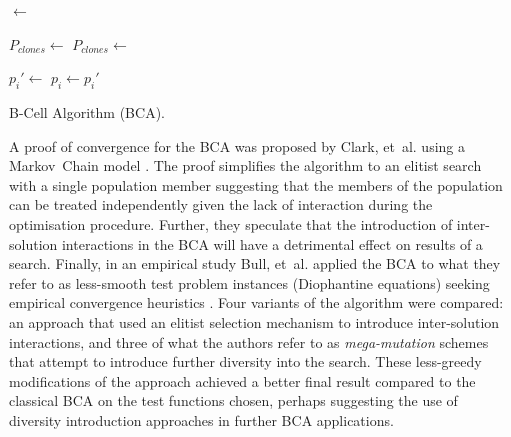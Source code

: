 \begin{algorithm}[ht]
  \SetLine
  
  
  
  \KwOut{\Pop}      
  
  \Pop $\leftarrow$ \CreateRandomCells{\PopSize, \Length}\;
  
	\While{$\neg$\StopCondition{}}
	{
		{
	  	\;
		}	 
	  {
	  	$P_{clones} \leftarrow $ \;	
	  	$P_{clones} \leftarrow $ \;	 %
	  	
	  	{
	   		\;
	   		\;
	   	}
	  	${p_i}\prime \leftarrow$ \;	  	
	  	{
	  		$p_i \leftarrow {p_i}\prime$\;
	  	}
	 	}	
	}
	\Return{\Pop}\;
	
	\caption{B-Cell Algorithm (BCA).}
	\label{alg:cs:algorithms:bca}
\end{algorithm}

A proof of convergence for the BCA was proposed by Clark, et~al. using a Markov~Chain model \cite{Clark2005}. The proof simplifies the algorithm to an elitist search with a single population member suggesting that the members of the population can be treated independently given the lack of interaction during the optimisation procedure. Further, they speculate that the introduction of inter-solution interactions in the BCA will have a detrimental effect on results of a search. Finally, in an empirical study Bull, et~al. applied the BCA to what they refer to as less-smooth test problem instances (Diophantine equations) seeking empirical convergence heuristics \cite{Bull2006}. Four variants of the algorithm were compared: an approach that used an elitist selection mechanism to introduce inter-solution interactions, and three of what the authors refer to as \emph{mega-mutation} schemes that attempt to introduce further diversity into the search. These less-greedy modifications of the approach achieved a better final result compared to the classical BCA on the test functions chosen, perhaps suggesting the use of diversity introduction approaches in further BCA applications. 

